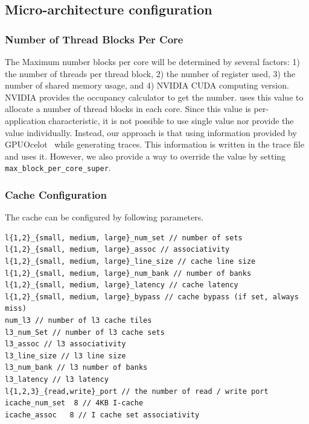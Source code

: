 \subsection{Micro-architecture configuration}

\subsubsection{Number of Thread Blocks Per Core}

The Maximum number blocks per core will be determined by several
factors: 1) the number of threads per thread block, 2) the number of
register used, 3) the number of shared memory usage, and 4) NVIDIA
CUDA computing version. NVIDIA provides the occupancy calculator to
get the number. \SIM uses this value to allocate a number of thread
blocks in each core. Since this value is per-application
characteristic, it is not possible to use single value nor provide the
value individually. Instead, our approach is that using information
provided by GPUOcelot~\cite{ocelot} while generating traces. This
information is written in the trace file and \SIM uses it. However, we
also provide a way to override the value by
setting \Verb+max_block_per_core_super+.



\subsubsection{Cache Configuration}

The cache can be configured by following parameters.

\begin{Verbatim}
l{1,2}_{small, medium, large}_num_set // number of sets
l{1,2}_{small, medium, large}_assoc // associativity
l{1,2}_{small, medium, large}_line_size // cache line size
l{1,2}_{small, medium, large}_num_bank // number of banks  
l{1,2}_{small, medium, large}_latency // cache latency
l{1,2}_{small, medium, large}_bypass // cache bypass (if set, always miss)
num_l3 // number of l3 cache tiles
l3_num_Set // number of l3 cache sets
l3_assoc // l3 associativity
l3_line_size // l3 line size
l3_num_bank // l3 number of banks
l3_latency // l3 latency
l{1,2,3}_{read,write}_port // the number of read / write port
icache_num_set  8 // 4KB I-cache 
icache_assoc   8 // I cache set associativity 
\end{Verbatim}


